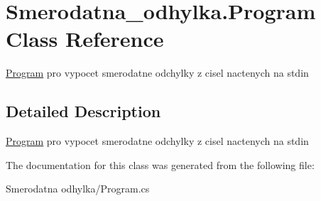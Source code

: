 \hypertarget{class_smerodatna__odhylka_1_1_program}{}\section{Smerodatna\+\_\+odhylka.\+Program Class Reference}
\label{class_smerodatna__odhylka_1_1_program}


\mbox{\hyperlink{class_smerodatna__odhylka_1_1_program}{Program}} pro vypocet smerodatne odchylky z cisel nactenych na stdin  




\subsection{Detailed Description}
\mbox{\hyperlink{class_smerodatna__odhylka_1_1_program}{Program}} pro vypocet smerodatne odchylky z cisel nactenych na stdin 



The documentation for this class was generated from the following file\+:\begin{DoxyCompactItemize}
\item 
Smerodatna odhylka/Program.\+cs\end{DoxyCompactItemize}
